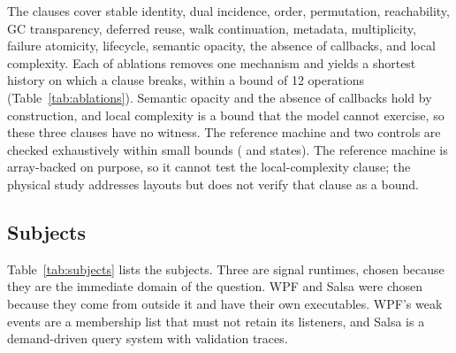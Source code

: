 \documentclass[11pt]{article}
\begin{document}
The \clauseCount{} clauses cover stable identity, dual incidence, order, permutation, reachability, GC transparency, deferred reuse, walk continuation, metadata, multiplicity, failure atomicity, lifecycle, semantic opacity, the absence of callbacks, and local complexity. Each of \ablationCount{} ablations removes one mechanism and yields a shortest history on which a clause breaks, within a bound of 12 operations (Table~\ref{tab:ablations}). Semantic opacity and the absence of callbacks hold by construction, and local complexity is a bound that the model cannot exercise, so these three clauses have no witness. The reference machine and two controls are checked exhaustively within small bounds (\exhaustiveStatesA{} and \exhaustiveStatesB{} states). The reference machine is array-backed on purpose, so it cannot test the local-complexity clause; the physical study addresses layouts but does not verify that clause as a bound.

\begin{table}[tbp]
\centering
\scriptsize

\caption{Single-mechanism ablations of the contract. ``Kind'' separates safety, semantic and structural failures from surface entries, which show only that a capability is observable. A witness shows that a mechanism is load-bearing for the contract and not that any client needs it.}
\label{tab:ablations}
\end{table}

\subsection{Subjects}

Table~\ref{tab:subjects} lists the subjects. Three are signal runtimes, chosen because they are the immediate domain of the question. WPF and Salsa were chosen because they come from outside it and have their own executables. WPF's weak events are a membership list that must not retain its listeners, and Salsa is a demand-driven query system with validation traces.
\end{document}

